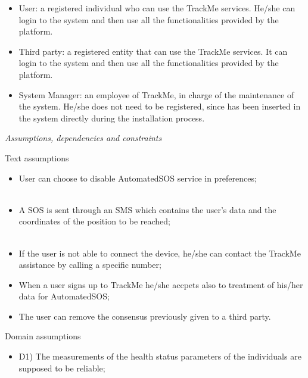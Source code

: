 \documentclass{article}
\begin{document}
\begin{legal}
\begin{legal}
{			\begin{itemize}
			 \item User: a registered individual who can use the TrackMe services. He/she can login to the system and then use all the functionalities provided by the platform.\\
			\item Third party: a registered entity that can use the TrackMe services. It can login to the system and then use all the functionalities provided by the platform.\\
 			\item System Manager:  an employee of TrackMe, in charge of the maintenance of the system. He/she does not need to be registered, since has been inserted in the system directly during the installation process.\\
			\end{itemize}
			}
		\item \textit{Assumptions, dependencies and constraints}\\
			\begin{legal}
    			\item Text assumptions\\
    			{\normalfont
				\begin{itemize}
					\item User can choose to disable AutomatedSOS service in preferences;\\\
					\item A SOS is sent through an SMS which contains the user's data and the coordinates of the position to be reached;\\\
					\item If the user is not able to connect the device, he/she can contact the TrackMe assistance by calling a specific number;\\
					\item When a user signs up to TrackMe he/she accpets also to treatment of his/her data for AutomatedSOS;\\
					\item The user can remove the consensus previously given to a third party.\\
				\end{itemize}}
			\newpage
			\item Domain assumptions \\
			{\normalfont
				\begin{itemize}
				\item D1) The measurements of the health status parameters of the individuals are supposed to be reliable;\\

\end{itemize}}
\end{legal}
\end{legal}
\end{legal}
\end{document}
